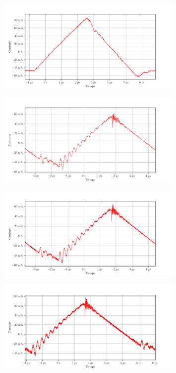 \begin{figure}[ht]
    \centering
    \includegraphics[width=0.8\textwidth]{images/capturas-osciloscopio/17-11-2022/25.png}
    \caption{}
    \label{fig:osc:25}
\end{figure}

\begin{figure}[ht]
    \centering
    \includegraphics[width=0.8\textwidth]{images/capturas-osciloscopio/17-11-2022/26.png}
    \caption{}
    \label{fig:osc:26}
\end{figure}

\begin{figure}[ht]
    \centering
    \includegraphics[width=0.8\textwidth]{images/capturas-osciloscopio/17-11-2022/27.png}
    \caption{}
    \label{fig:osc:27}
\end{figure}

\begin{figure}[ht]
    \centering
    \includegraphics[width=0.8\textwidth]{images/capturas-osciloscopio/17-11-2022/28.png}
    \caption{}
    \label{fig:osc:28}
\end{figure}

